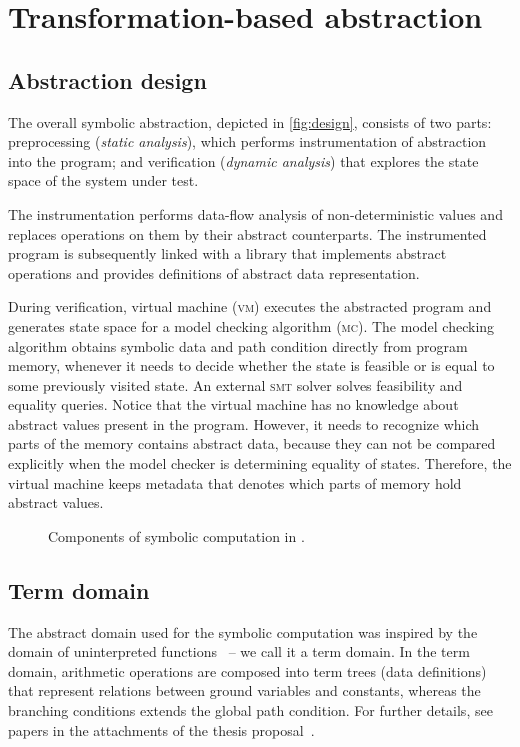 \section{Transformation-based abstraction}
\label{sec:symbolic}

\subsection{Abstraction design}

The overall symbolic abstraction, depicted in \autoref{fig:design}, consists of
two parts: preprocessing (\emph{static analysis}), which performs
instrumentation of abstraction into the program; and verification
(\emph{dynamic analysis}) that explores the state space of the system under
test.

The instrumentation performs data-flow analysis of non-de\-ter\-ministic values and
replaces operations on them by their abstract counterparts. The instrumented
program is subsequently linked with a library that implements abstract
operations and provides definitions of abstract data representation.

During verification, virtual machine (\textsc{vm}) executes the abs\-trac\-ted
program and generates state space for a model checking algorithm (\textsc{mc}).
The model checking algorithm obtains symbolic data and path condition directly
from program memory, whenever it needs to decide whether the state is feasible
or is equal to some previously visited state. An external \textsc{smt} solver solves
feasibility and equality queries. Notice that the virtual machine has no knowledge
about abstract values present in the program.
However, it needs to recognize which parts of the memory contains abstract data,
because they can not be compared explicitly when the model checker is
determining equality of states. Therefore, the virtual machine keeps metadata
that denotes which parts of memory hold abstract values.

\begin{figure}
    \centering
    
    \caption{Components of symbolic computation in \divine.}
    \label{fig:design}
\end{figure}

\subsection{Term domain}

The abstract domain used for the symbolic computation was inspired by the
domain of uninterpreted functions~\cite{Gange2016} -- we call it a term domain.
In the term domain, arithmetic operations are composed into term trees (data
definitions) that represent relations between ground variables and constants,
whereas the branching conditions extends the global path condition.  For
further details, see papers in the attachments of the thesis
proposal~\cite{Lauko2018SymComp, Lauko2019Sym}.

